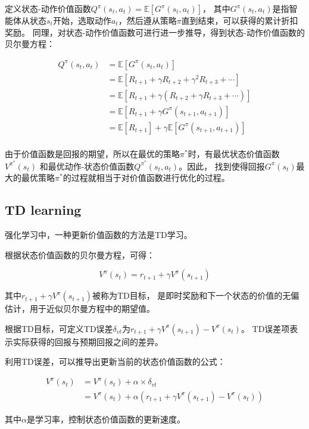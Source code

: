 \documentclass[UTF8]{ctexart}
\begin{document}
定义状态-动作价值函数$Q^{\pi}(s_t, a_t) = \mathbb{E}[G^{\pi}(s_t, a_t)]$，
其中$G^{\pi}(s_t, a_t)$是指智能体从状态$s_t$开始，选取动作$a_t$，然后遵从策略$\pi$直到结束，可以获得的累计折扣奖励。
同理，对状态-动作价值函数可进行进一步推导，得到状态-动作价值函数的贝尔曼方程：

\begin{align*}
	Q^{\pi}(s_t, a_t) &= \mathbb{E}[G^{\pi}(s_t, a_t)]  \\
	&= \mathbb{E}[R_{t+1} + \gamma R_{t+2} + \gamma^2 R_{t+3} + \cdots]  \\
	&= \mathbb{E}[R_{t+1} + \gamma (R_{t+2} + \gamma R_{t+3} + \cdots)]  \\
	&= \mathbb{E}[R_{t+1} + \gamma G^{\pi}(s_{t+1}, a_{t+1})] \\
	&= \mathbb{E}[R_{t+1}] + \gamma \mathbb{E}[G^{\pi}(s_{t+1}, a_{t+1})] \\
\end{align*}

由于价值函数是回报的期望，所以在最优的策略$\pi^*$时，有最优状态价值函数$V^{\pi^*}(s_t)$
和最优动作-状态价值函数$Q^{\pi^*}(s_t, a_t)$。因此，
找到使得回报$G^{\pi}(s_t)$最大的最优策略$\pi^*$的过程就相当于对价值函数进行优化的过程。

\subsection{TD learning}

强化学习中，一种更新价值函数的方法是TD学习。

根据状态价值函数的贝尔曼方程，可得：

$$V^{\pi}(s_t) = r_{t+1} + \gamma V^{\pi}(s_{t+1})$$

其中$r_{t+1} + \gamma V^{\pi}(s_{t+1})$被称为TD目标，
是即时奖励和下一个状态的价值的无偏估计，用于近似贝尔曼方程中的期望值。

根据TD目标，可定义TD误差$\delta_{vt}$为$r_{t+1} + \gamma V^{\pi}(s_{t+1}) - V^{\pi}(s_t)$。
TD误差项表示实际获得的回报与预期回报之间的差异。

利用TD误差，可以推导出更新当前的状态价值函数的公式：

\begin{align*}
	V^{\pi}(s_t) &= V^{\pi}(s_t) + \alpha \times \delta_{vt}  \\
	&= V^{\pi}(s_t) + \alpha (r_{t+1} + \gamma V^{\pi}(s_{t+1}) - V^{\pi}(s_t))
\end{align*}

其中$\alpha$是学习率，控制状态价值函数的更新速度。
\end{document}
